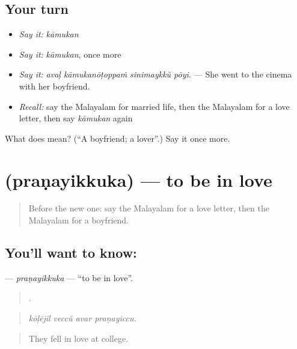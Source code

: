 \subsection*{Your turn}
\begin{itemize}
\raggedright
  \item \emph{Say it:} \emph{kāmukan}
  \item \emph{Say it:} \emph{kāmukan}, once more
  \item \emph{Say it:} \emph{avaḷ kāmukanōṭoppaṁ sinimaykkŭ pōyi.} — She went to the cinema with her boyfriend.
  \item \emph{Recall:} say the Malayalam for married life, then the Malayalam for a love letter, then say \emph{kāmukan} again
\end{itemize}

\begin{tcolorbox}[breakable,colback=teal!4,colframe=teal!35!black,title={Before you move on}]
What does  mean? (\textquotedblleft{}A boyfriend; a lover\textquotedblright{}.) Say it once more.
\end{tcolorbox}
\section[\texorpdfstring{\ml{പ്രണയിക്കുക} (praṇayikkuka)}{പ്രണയിക്കുക (praṇayikkuka)}]{ (praṇayikkuka) — to be in love}

\label{lesson:ML-C552-pranayikkuka}



\begin{quote}
Before the new one: say the Malayalam for a love letter, then the Malayalam for a boyfriend.
\end{quote}

\subsection*{You'll want to know: }
\textbf{} — \emph{praṇayikkuka} — \textquotedblleft{}to be in love\textquotedblright{}.

\begin{quote}
   .
\end{quote}

\begin{quote}
\emph{kōḷējil veccŭ avar praṇayiccu.}
\end{quote}

\begin{quote}
They fell in love at college.
\end{quote}

